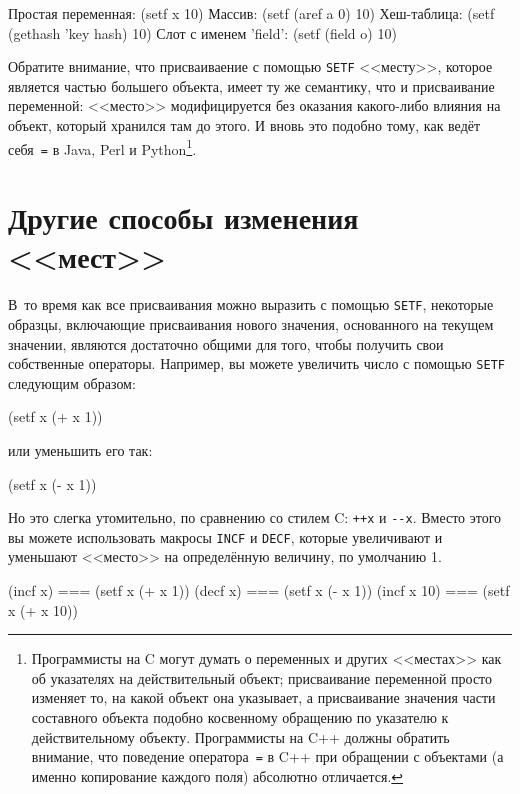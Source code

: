 \begin{myverb}
Простая переменная:    (setf x 10) 
Массив:                (setf (aref a 0) 10)
Хеш-таблица:           (setf (gethash 'key hash) 10)
Слот с именем 'field': (setf (field o) 10)
\end{myverb}

Обратите внимание, что присваиваение с помощью \lstinline{SETF} <<месту>>, которое является
частью большего объекта, имеет ту же семантику, что и присваивание переменной: <<место>>
модифицируется без оказания какого-либо влияния на объект, который хранился там до
этого. И вновь это подобно тому, как ведёт себя~\lstinline{=} в Java, Perl и
Python\footnote{Программисты на C могут думать о переменных и других <<местах>> как об
  указателях на действительный объект; присваивание переменной просто изменяет
  то, на какой объект она указывает, а присваивание значения части составного объекта
  подобно косвенному обращению по указателю к действительному объекту. Программисты на C++
  должны обратить внимание, что поведение оператора~\lstinline{=} в C++ при обращении с объектами (а
  именно копирование каждого поля) абсолютно отличается.}\hspace{\footnotenegspace}.

\section{Другие способы изменения <<мест>>}

В~то время как все присваивания можно выразить с помощью \lstinline{SETF}, некоторые образцы,
включающие присваивания нового значения, основанного на текущем значении, являются
достаточно общими для того, чтобы получить свои собственные операторы. Например, вы можете
увеличить число с помощью \lstinline{SETF} следующим образом:

\begin{myverb}
(setf x (+ x 1))
\end{myverb}

\noindent{}или уменьшить его так:

\begin{myverb}
(setf x (- x 1))
\end{myverb}

Но это слегка утомительно, по сравнению со стилем C: \lstinline{++x} и \lstinline{--x}. Вместо этого
вы можете использовать макросы \lstinline{INCF} и \lstinline{DECF}, которые увеличивают и
уменьшают <<место>> на определённую величину, по умолчанию 1.

\begin{myverb}
(incf x)    === (setf x (+ x 1))
(decf x)    === (setf x (- x 1))
(incf x 10) === (setf x (+ x 10))
\end{myverb}

